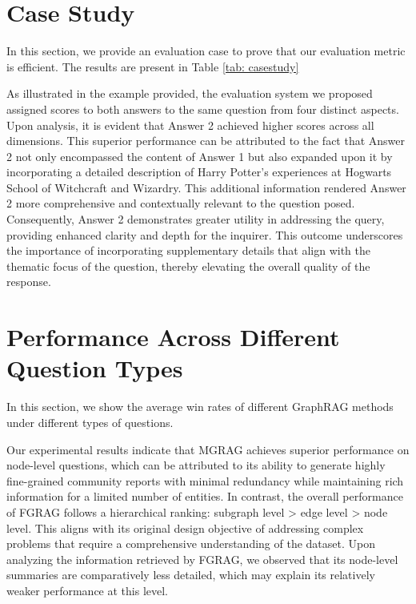 \section{Case Study}
\label{app:case study}
In this section, we provide an evaluation case to prove that our evaluation metric is efficient. The results are present in Table \ref{tab: casestudy}

As illustrated in the example provided, the evaluation system we proposed assigned scores to both answers to the same question from four distinct aspects. Upon analysis, it is evident that Answer 2 achieved higher scores across all dimensions. This superior performance can be attributed to the fact that Answer 2 not only encompassed the content of Answer 1 but also expanded upon it by incorporating a detailed description of Harry Potter's experiences at Hogwarts School of Witchcraft and Wizardry. This additional information rendered Answer 2 more comprehensive and contextually relevant to the question posed. Consequently, Answer 2 demonstrates greater utility in addressing the query, providing enhanced clarity and depth for the inquirer. This outcome underscores the importance of incorporating supplementary details that align with the thematic focus of the question, thereby elevating the overall quality of the response.

\section{Performance Across Different Question Types}
\label{app:questiontype}

In this section, we show the average win rates of different GraphRAG methods under different types of questions. 


Our experimental results indicate that MGRAG achieves superior performance on node-level questions, which can be attributed to its ability to generate highly fine-grained community reports with minimal redundancy while maintaining rich information for a limited number of entities. In contrast, the overall performance of FGRAG follows a hierarchical ranking: subgraph level > edge level > node level. This aligns with its original design objective of addressing complex problems that require a comprehensive understanding of the dataset. Upon analyzing the information retrieved by FGRAG, we observed that its node-level summaries are comparatively less detailed, which may explain its relatively weaker performance at this level.

